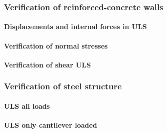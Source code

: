 \subsubsection{Verification of reinforced-concrete walls}

\twocolumn
\paragraph{Displacements and internal forces in ULS}

\clearpage
\paragraph{Verification of normal stresses}

\clearpage
\paragraph{Verification of shear ULS}

\clearpage

\subsubsection{Verification of steel structure}
\paragraph{ULS all loads}

\paragraph{ULS only cantilever loaded}

\onecolumn
